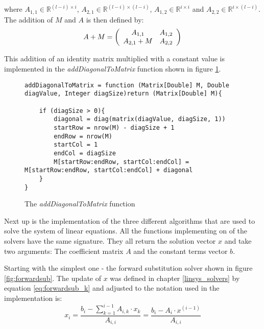 where $A_{1,1} \in \mathbb{R}^{(l-i) \times i}$, $A_{2,1} \in \mathbb{R}^{(l-i) \times (l-i)}$, $A_{1,2} \in \mathbb{R}^{i \times i}$ and  $A_{2,2} \in \mathbb{R}^{i \times (l-i)}$. The addition of $M$ and $A$ is then defined by:
\begin{equation}
    A+M = \left(\begin{array}[c]{cc}
        A_{1,1} & A_{1,2}\\
        A_{2,1} + M & A_{2,2}
    \end{array}\right) 
\end{equation}

This addition of an identity matrix multiplied with a constant value is implemented in the \textit{addDiagonalToMatrix} function shown in figure \ref{fig:addDiagonalToMatrix}.

\begin{figure}[!ht]
\centering
\begin{verbatim}
addDiagonalToMatrix = function (Matrix[Double] M, Double diagValue, Integer diagSize)return (Matrix[Double] M){

    if (diagSize > 0){
        diagonal = diag(matrix(diagValue, diagSize, 1))
        startRow = nrow(M) - diagSize + 1
        endRow = nrow(M)
        startCol = 1
        endCol = diagSize
        M[startRow:endRow, startCol:endCol] = M[startRow:endRow, startCol:endCol] + diagonal
    }
}
\end{verbatim}
\vspace*{-0.3cm}
\caption{The \textit{addDiagonalToMatrix} function}
\label{fig:addDiagonalToMatrix}
\end{figure}

Next up is the implementation of the three different algorithms that are used to solve the system of linear equations. All the functions implementing on of the solvers have the same signature. They all return the solution vector $x$ and take two arguments: The coefficient matrix $A$ and the constant terms vector $b$.

Starting with the simplest one - the forward substitution solver shown in figure \ref{fig:forwardsub}. The update of $x$ was defined in chapter \ref{linsys_solvers} by equation \ref{eq:forwardsub_k} and adjusted to the notation used in the implementation is:
\begin{equation*}
   x_i = \frac{b_i - \sum_{k=1}^{i-1} A_{i,k} \cdot x_k}{A_{i,i}} = \frac{b_i - A_{i} \cdot x^{(i-1)} }{A_{i,i}}
\end{equation*}


